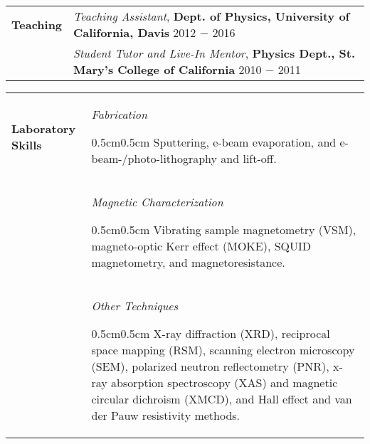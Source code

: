 \documentclass[10pt,letterpaper]{article}
\newcommand{\coll}{1.2}
\newcommand{\colr}{8}
\newcommand{\ind}[1]{
    \begin{adjustwidth}{0.5cm}{0.5cm}
        #1
    \end{adjustwidth}
}
\begin{document}
\vspace{-0.8cm}
\begin{longtabu} to \textwidth{X[\coll] X[\colr]}
    \textbf{Teaching} & \emph{Teaching Assistant}, \textbf{Dept. of Physics, University of California, Davis} \hfill 2012 $-$ 2016 \\
    & \emph{Student Tutor and Live-In Mentor}, \textbf{Physics Dept., St. Mary's College of California} \hfill 2010 $-$ 2011
\end{longtabu}

\vspace{-0.5cm}
\begin{longtabu} to \textwidth{X[\coll] X[\colr]}
    \textbf{Laboratory Skills} & \emph{Fabrication} \newline
    \vspace{-3mm}
    \ind{Sputtering, e-beam evaporation, and e-beam-/photo-lithography and lift-off.} \\
    & \emph{Magnetic Characterization} \newline
    \vspace{-3mm}
    \ind{Vibrating sample magnetometry (VSM), magneto-optic Kerr effect (MOKE), SQUID magnetometry, and magnetoresistance.} \\
    & \emph{Other Techniques} \newline
    \vspace{-3mm}
    \ind{X-ray diffraction (XRD), reciprocal space mapping (RSM), scanning electron microscopy (SEM), polarized neutron reflectometry (PNR), x-ray absorption spectroscopy (XAS) and magnetic circular dichroism (XMCD), and Hall effect and van der Pauw resistivity methods.}
\end{longtabu}
\end{document}
